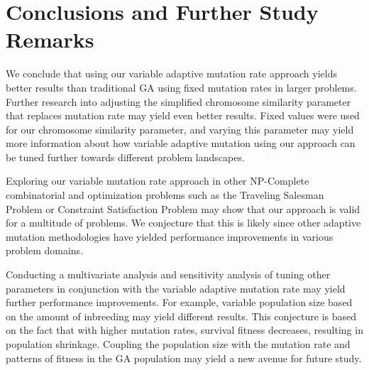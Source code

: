 \documentclass[conference]{IEEEtran}
\begin{document}
\section{Conclusions and Further Study Remarks}
We conclude that using our variable adaptive mutation rate approach yields better results than traditional GA using fixed mutation rates in larger problems. Further research into adjusting the simplified chromosome similarity parameter that replaces mutation rate may yield even better results. Fixed values were used for our chromosome similarity parameter, and varying this parameter may yield more information about how variable adaptive mutation using our approach can be tuned further towards different problem landscapes.

Exploring our variable mutation rate approach in other NP-Complete combinatorial and optimization problems such as the Traveling Salesman Problem or Constraint Satisfaction Problem may show that our approach is valid for a multitude of problems. We conjecture that this is likely since other adaptive mutation methodologies have yielded performance improvements in various problem domains.

Conducting a multivariate analysis and sensitivity analysis of tuning other parameters in conjunction with the variable adaptive mutation rate may yield further performance improvements. For example, variable population size based on the amount of inbreeding may yield different results. This conjecture is based on the fact that with higher mutation rates, survival fitness decreases, resulting in population shrinkage. Coupling the population size with the mutation rate and patterns of fitness in the GA population may yield a new avenue for future study.




%
%
%
\end{document}

